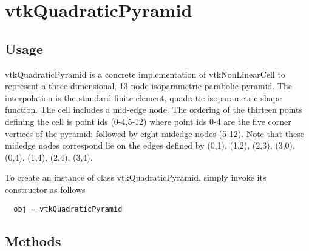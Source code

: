 \section{vtkQuadraticPyramid}

\subsection{Usage}

 vtkQuadraticPyramid is a concrete implementation of vtkNonLinearCell to
 represent a three-dimensional, 13-node isoparametric parabolic
 pyramid. The interpolation is the standard finite element, quadratic
 isoparametric shape function. The cell includes a mid-edge node. The
 ordering of the thirteen points defining the cell is point ids (0-4,5-12)
 where point ids 0-4 are the five corner vertices of the pyramid; followed
 by eight midedge nodes (5-12). Note that these midedge nodes correspond lie
 on the edges defined by (0,1), (1,2), (2,3), (3,0), (0,4), (1,4), (2,4),
 (3,4).

To create an instance of class vtkQuadraticPyramid, simply
invoke its constructor as follows
\begin{verbatim}
  obj = vtkQuadraticPyramid
\end{verbatim}
\subsection{Methods}

